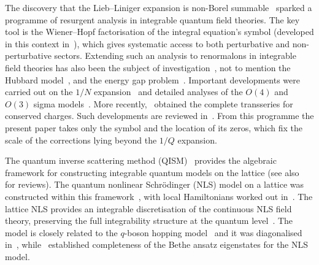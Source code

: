\documentclass[11pt,a4paper]{article}
\theoremstyle{definition}
\begin{document}
The discovery that the Lieb--Liniger expansion
is non-Borel summable~\cite{MarinoReis2019} sparked a programme of resurgent analysis in integrable quantum field theories. 
The key tool is the Wiener--Hopf factorisation of the integral equation's symbol
(developed in this context in~\cite{Volin2010,Volin2011}), which gives
systematic access to both perturbative and non-perturbative sectors.
Extending such an analysis to renormalons in integrable field
theories has also been the subject of investigation~\cite{MarinoReis2020a,MarinoReis2020b}, not to mention the Hubbard model~\cite{MarinoReis2022Hubbard}, and the energy gap
problem~\cite{MarinoReis2022gap}.
Important developments were carried out on the $1/N$ expansion~\cite{DiPietroEtAl2021} and detailed
analyses of the $O(4)$ and $O(3)$ sigma models~\cite{AbbottEtAl2021,BajnokBalogVona2022,BajnokBalogVona2022instanton}.
More recently,~\cite{BajnokBalogVona2025} obtained the complete
transseries for conserved charges. 
Such developments are reviewed in~\cite{AnicetoBasarSchiappa2019,Dorigoni2019}.
From this programme the present paper takes only the symbol and the location of
its zeros, which fix the scale of the corrections lying beyond the $1/Q$
expansion.

The quantum inverse scattering method (QISM)~\cite{SklyaninTakhtajanFaddeev1979,Sklyanin1982} provides the algebraic framework
for constructing integrable quantum models on the lattice (see
also~\cite{Faddeev1981,Faddeev1984,Faddeev1995,Faddeev1996} for reviews).
The quantum nonlinear Schr\"odinger (NLS) model on a lattice was constructed
within this framework~\cite{IzerginKorepin1981,IzerginKorepin1982,Kulish1981,Sklyanin1982}, 
with local Hamiltonians worked out in~\cite{TarasovTakhtajanFaddeev1983}.
The lattice NLS provides an integrable discretisation of the continuous NLS field
theory, preserving the full integrability structure at the quantum
level~\cite{KorepinBogoliubovIzergin1993,BogoliubovKorepin1986}.
The model is closely related to the $q$-boson hopping model~\cite{BogoliubovBulloughTimonen1993} 
and it was diagonalised in~\cite{vanDiejen2006}, while~\cite{Dorlas1993} established completeness of the Bethe ansatz eigenstates for the NLS model.
\end{document}
